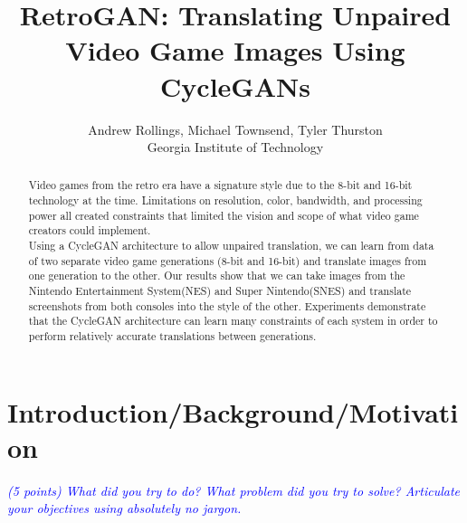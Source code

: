 \documentclass[10pt,twocolumn,letterpaper]{article}
\begin{document}
\title{RetroGAN: Translating Unpaired Video Game Images Using CycleGANs}

\author{Andrew Rollings, Michael Townsend, Tyler Thurston\\
   Georgia Institute of Technology\\
}

\maketitle

\begin{abstract}
   Video games from the retro era have a signature style due to the 8-bit and 16-bit technology at the time. Limitations on resolution, color, bandwidth, and processing power all created constraints that limited the vision and scope of what video game creators could implement. \\Using a CycleGAN architecture to allow unpaired translation, we can learn from data of two separate video game generations (8-bit and 16-bit) and translate images from one generation to the other. Our results show that we can take images from the Nintendo Entertainment System(NES) and Super Nintendo(SNES) and translate screenshots from both consoles into the style of the other. Experiments demonstrate that the CycleGAN architecture can learn many constraints of each system in order to perform relatively accurate translations between generations.
\end{abstract}

\section{Introduction/Background/Motivation}
\textit{\textcolor{blue}{(5 points) What did you try to do? What problem did you try to solve? Articulate your objectives using absolutely no jargon.}}
\end{document}
